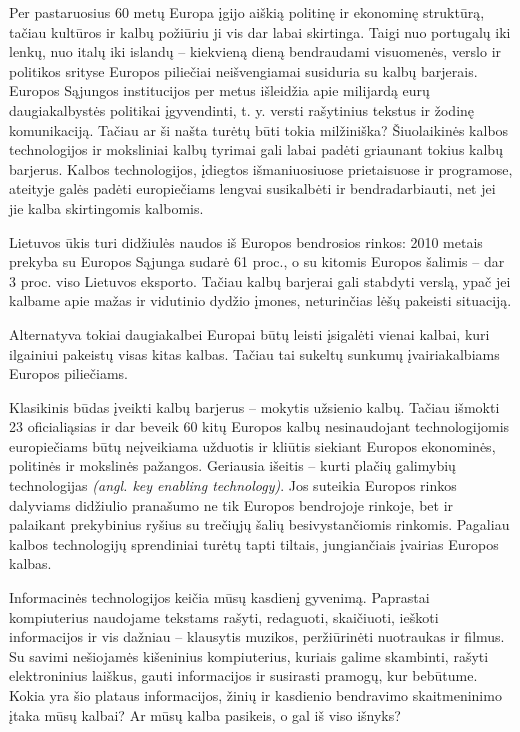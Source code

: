 \begin{multicols}{2}
Per pastaruosius 60 metų Europa įgijo aiškią politinę ir ekonominę struktūrą, tačiau kultūros ir kalbų požiūriu ji vis dar labai skirtinga. Taigi nuo portugalų iki lenkų, nuo italų iki islandų – kiekvieną dieną bendraudami visuomenės, verslo ir politikos srityse Europos piliečiai neišvengiamai susiduria su kalbų barjerais. Europos Sąjungos institucijos per metus išleidžia apie milijardą eurų daugiakalbystės politikai įgyvendinti, t. y. versti rašytinius tekstus ir žodinę komunikaciją. Tačiau ar ši našta turėtų būti tokia milžiniška? Šiuolaikinės kalbos technologijos ir moksliniai kalbų tyrimai gali labai padėti griaunant tokius kalbų barjerus. Kalbos technologijos, įdiegtos išmaniuosiuose prietaisuose ir programose, ateityje galės padėti europiečiams lengvai susikalbėti ir bendradarbiauti, net jei jie kalba skirtingomis kalbomis.

Lietuvos ūkis turi didžiulės naudos iš Europos bendrosios rinkos: 2010 metais prekyba su Europos Sąjunga sudarė 61 proc., o su kitomis Europos šalimis – dar 3 proc. viso Lietuvos eksporto. Tačiau kalbų barjerai gali stabdyti verslą, ypač jei kalbame apie mažas ir vidutinio dydžio įmones, neturinčias lėšų pakeisti situaciją. 

Alternatyva tokiai daugiakalbei Europai būtų leisti įsigalėti vienai kalbai, kuri ilgainiui pakeistų visas kitas kalbas. Tačiau tai sukeltų sunkumų įvairiakalbiams Europos piliečiams. 

Klasikinis būdas įveikti kalbų barjerus – mokytis užsienio kalbų. Tačiau išmokti 23 oficialiąsias ir dar beveik 60 kitų Europos kalbų nesinaudojant technologijomis europiečiams būtų neįveikiama užduotis ir kliūtis siekiant Europos ekonominės, politinės ir mokslinės pažangos.
Geriausia išeitis – kurti plačių galimybių technologijas \textit{(angl. key enabling technology)}. Jos suteikia Europos rinkos dalyviams didžiulio pranašumo ne tik Europos bendrojoje rinkoje, bet ir palaikant prekybinius ryšius su trečiųjų šalių besivystančiomis rinkomis. Pagaliau kalbos technologijų sprendiniai turėtų tapti tiltais, jungiančiais įvairias Europos kalbas. 


Informacinės technologijos keičia mūsų kasdienį gyvenimą. Paprastai kompiuterius naudojame tekstams rašyti, redaguoti, skaičiuoti, ieškoti informacijos ir vis dažniau – klausytis muzikos, peržiūrinėti nuotraukas ir filmus. Su savimi nešiojamės kišeninius kompiuterius, kuriais galime skambinti, rašyti elektroninius laiškus, gauti informacijos ir susirasti pramogų, kur bebūtume. Kokia yra šio plataus informacijos, žinių ir kasdienio bendravimo skaitmeninimo įtaka mūsų kalbai? Ar mūsų kalba pasikeis, o gal iš viso išnyks? 


\end{multicols}
